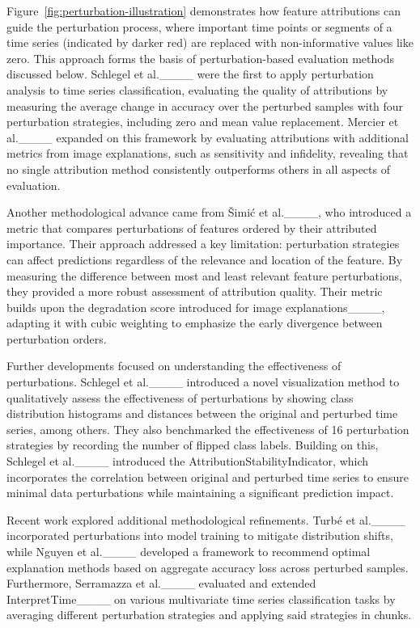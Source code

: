 

Figure~\ref{fig:perturbation-illustration} demonstrates how feature attributions can guide the perturbation process, where important time points or segments of a time series (indicated by darker red) are replaced with non-informative values like zero. This approach forms the basis of perturbation-based evaluation methods discussed below.
Schlegel et al.____ were the first to apply perturbation analysis to time series classification, evaluating the quality of attributions by measuring the average change in accuracy over the perturbed samples with four perturbation strategies, including zero and mean value replacement.
Mercier et al.____ expanded on this framework by evaluating attributions with additional metrics from image explanations, such as sensitivity and infidelity, revealing that no single attribution method consistently outperforms others in all aspects of evaluation.



Another methodological advance came from Šimić et al.____, who introduced a metric that compares perturbations of features ordered by their attributed importance. Their approach addressed a key limitation: perturbation strategies can affect predictions regardless of the relevance and location of the feature. By measuring the difference between most and least relevant feature perturbations, they provided a more robust assessment of attribution quality. Their metric builds upon the degradation score introduced for image explanations____, adapting it with cubic weighting to emphasize the early divergence between perturbation orders.

Further developments focused on understanding the effectiveness of perturbations. 
Schlegel et al.____ introduced a novel visualization method to qualitatively assess the effectiveness of perturbations by showing class distribution histograms and distances between the original and perturbed time series, among others. They also benchmarked the effectiveness of 16 perturbation strategies by recording the number of flipped class labels.
Building on this, Schlegel et al.____ introduced the AttributionStabilityIndicator, which incorporates the correlation between original and perturbed time series to ensure minimal data perturbations while maintaining a significant prediction impact.

Recent work explored additional methodological refinements. Turbé et al.____ incorporated perturbations into model training to mitigate distribution shifts, while Nguyen et al.____ developed a framework to recommend optimal explanation methods based on aggregate accuracy loss across perturbed samples.
Furthermore, Serramazza et al.____ evaluated and extended InterpretTime____ on various multivariate time series classification tasks by averaging different perturbation strategies and applying said strategies in chunks.

